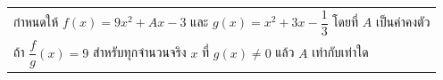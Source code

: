 ﻿%
\question \begin{tabular}[t]{@{}l@{}}
กำหนดให้ $f(x) = 9x^2 + Ax - 3$ และ $g(x) = x^2+3x-\dfrac{1}{3} $ โดยที่ $A$ เป็นค่าคงตัว \\[0.5ex]
ถ้า $\dfrac{f}{g}(x) = 9 $ สำหรับทุกจำนวนจริง $x$ ที่ $g(x)\neq 0$ แล้ว $A$ เท่ากับเท่าใด
\end{tabular}

